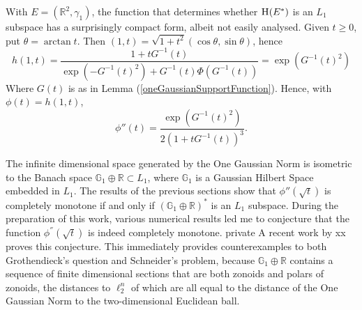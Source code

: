 \documentclass{article}[1100]
\theoremstyle{definition}
\theoremstyle{remark}
\newcommand\Ren[1]{\mathbb{R}^{#1}}
\newcommand\ar{\mathbb{R}}
\newcommand\mySpaceH[1]{\textsc{H}(#1)}
\begin{document}
With $E=(\Ren{2},\gamma_1)$, the function that determines whether $\mySpaceH{E^*}$ is an $L_1$ subspace has a surprisingly compact form, albeit not easily analysed.
Given $t\geq 0$, put $\theta=\arctan t$. Then $(1,t)=\sqrt{1+t^2}(\cos\theta,\sin\theta)$, hence
\begin{equation}\label{supportFunctionIdentity}
h(1,t)=\frac{1+tG^{-1}(t)}{\exp(-G^{-1}(t)^2)+G^{-1}(t)\Phi(G^{-1}(t))}=\exp(G^{-1}(t)^2)
\end{equation}
Where $G(t)$ is as in Lemma (\ref{oneGaussianSupportFunction}).  Hence, with $\phi(t)=h(1,t)$,
\begin{equation}\label{secondDerivativeSupport}
\phi''(t)=\frac{\exp(G^{-1}(t)^2)}{2(1+tG^{-1}(t))^3}.
\end{equation}

The infinite dimensional space generated
by the One Gaussian Norm is isometric to the Banach space $\mathbb{G}_1\oplus \ar\subset L_1$, where $\mathbb{G}_1$ is a Gaussian Hilbert Space embedded in $L_1$. The results of the previous sections show that  $\phi''(\sqrt{t})$ is completely monotone if and only if $(\mathbb{G}_1\oplus \ar)^*$ is an $L_1$ subspace. During the preparation of this work, various numerical results led me to conjecture that the function $\phi^{''}(\sqrt{t})$ is indeed completely monotone. {private} A recent work
by {xx} proves this conjecture. 
This  immediately provides counterexamples to both Grothendieck's question and Schneider's problem, 
because  $\mathbb{G}_1\oplus\ar$ contains a sequence of finite dimensional sections that are both zonoids and polars of zonoids,  
the distances to $\ell_2^n$ of which are all equal to the distance of the One Gaussian Norm to the two-dimensional Euclidean ball. 



\printbibliography
%
\end{document}

